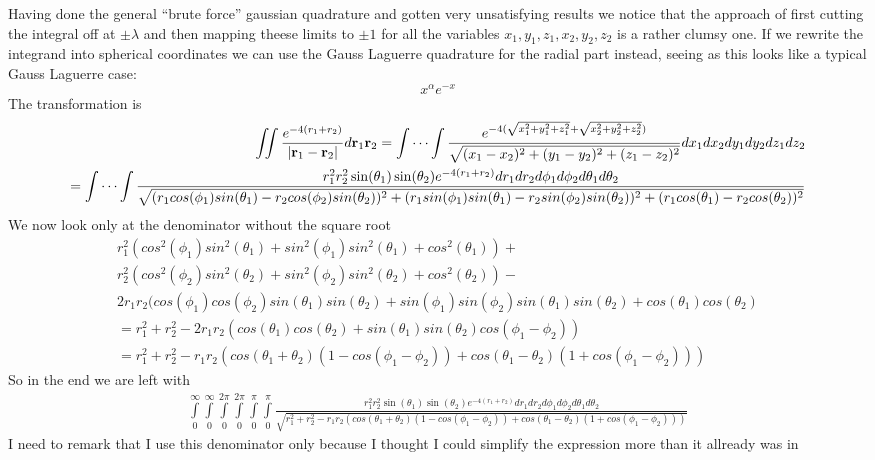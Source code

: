 \documentclass[a4paper,english, 10pt, twoside]{article}
\begin{document}
Having done the general ``brute force'' gaussian quadrature and gotten very unsatisfying results we notice that the approach of 
first cutting the integral off at $\pm \lambda$ and then mapping theese limits to $\pm 1$ for all the variables 
$x_1,y_1,z_1,x_2,y_2,z_2$ is a rather clumsy one. If we rewrite the integrand into spherical coordinates we can use the Gauss 
Laguerre quadrature for the radial part instead, seeing as this looks like a typical Gauss Laguerre case:
$$
x^{\alpha}e^{-x}
$$
The transformation is
\begin{align*}
\iint \frac{e^{-4(r_1+r_2)}}{\left|\mathbf{r}_1-\mathbf{r}_2\right|}d\mathbf{r}_1\mathbf{r}_2 = 
\idotsint \frac{e^{-4(\sqrt{x_1^2 + y_1^2 + z_1^2}+\sqrt{x_2^2 + y_2^2 + z_2^2})}}{\sqrt{(x_1-x_2)^2+(y_1-y_2)^2+(z_1-z_2)^2}}
dx_1dx_2dy_1dy_2dz_1dz_2\\
 = \idotsint\frac{r_1^2r_2^2\sin(\theta_1)\sin(\theta_2)e^{-4(r_1+r_2)}dr_1dr_2d\phi_1d\phi_2d\theta_1d\theta_2}
 {\sqrt{(r_1cos(\phi_1)sin(\theta_1)-r_2cos(\phi_2)sin(\theta_2))^2
 +(r_1sin(\phi_1)sin(\theta_1)-r_2sin(\phi_2)sin(\theta_2))^2+(r_1cos(\theta_1)-r_2cos(\theta_2))^2}}
\end{align*}
We now look only at the denominator without the square root
\begin{align*}
r_1^2(cos^2(\phi_1)sin^2(\theta_1)+sin^2(\phi_1)sin^2(\theta_1)+cos^2(\theta_1)) + \\
r_2^2(cos^2(\phi_2)sin^2(\theta_2)+sin^2(\phi_2)sin^2(\theta_2)+cos^2(\theta_2)) -\\
2r_1r_2(cos(\phi_1)cos(\phi_2)sin(\theta_1)sin(\theta_2) + sin(\phi_1)sin(\phi_2)sin(\theta_1)sin(\theta_2) + cos(\theta_1)cos(\theta_2)\\
= r_1^2 + r_2^2 -2r_1r_2(cos(\theta_1)cos(\theta_2)+sin(\theta_1)sin(\theta_2)cos(\phi_1 - \phi_2))\\
= r_1^2 + r_2^2 -r_1r_2(cos(\theta_1+\theta_2)(1-cos(\phi_1 - \phi_2))+cos(\theta_1-\theta_2)(1+cos(\phi_1 - \phi_2)))
\end{align*}
So in the end we are left with
\begin{align*}
\int\limits_0^{\infty}\int\limits_0^{\infty}\int\limits_0^{2\pi}\int\limits_0^{2\pi}\int\limits_0^{\pi}\int\limits_0^{\pi}
\frac{r_1^2r_2^2\sin(\theta_1)\sin(\theta_2)e^{-4(r_1+r_2)}dr_1dr_2d\phi_1d\phi_2d\theta_1d\theta_2}
{\sqrt{r_1^2 + r_2^2 -r_1r_2(cos(\theta_1+\theta_2)(1-cos(\phi_1 - \phi_2))+cos(\theta_1-\theta_2)(1+cos(\phi_1 - \phi_2)))}}
\end{align*}
I need to remark that I use this denominator only because I thought I could simplify the expression more than it allready was in 
\end{document}

